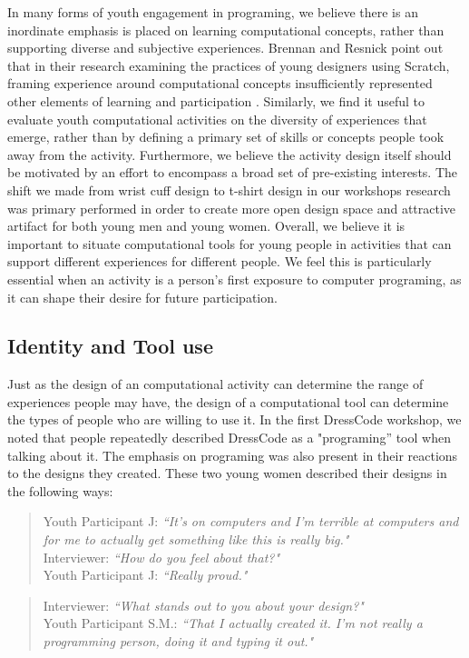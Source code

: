 \documentclass{sigchi}
\begin{document}
In many forms of youth engagement in programing, we believe there is an inordinate emphasis is placed on learning computational concepts, rather than supporting diverse and subjective experiences. Brennan and Resnick point out that in their research examining the practices of young designers using Scratch, framing experience around computational concepts insufficiently represented other elements of learning and participation \cite{computational_thinking}. Similarly, we find it useful to evaluate youth computational activities on the diversity of experiences that emerge, rather than by defining a primary set of skills or concepts people took away from the activity. Furthermore, we believe the activity design itself should be motivated by an effort to encompass a broad set of pre-existing interests. The shift we made from wrist cuff design to t-shirt design in our workshops research was primary performed in order to create more open design space and attractive artifact for both young men and young women. Overall, we believe it is important to situate computational tools for young people in activities that can support different experiences for different people. We feel this is particularly essential when an activity is a person's first exposure to computer programing, as it can shape their desire for future participation. 

\subsection{Identity and Tool use}
Just as the design of an computational activity can determine the range of experiences people may have, the design of a computational tool can determine the types of people who are willing to use it. In the first DressCode workshop, we noted that people repeatedly described DressCode as a "programing'' tool when talking about it. The emphasis on programing was also present in their reactions to the designs they created. These two young women described their designs in the following ways:
 \begin{quotation}
Youth Participant J: \textit{``It's on computers and I'm terrible at computers and for me to actually get something like this is really big."} 
\\Interviewer:  \textit{``How do you feel about that?"}
\\Youth Participant J:  \textit{``Really proud."} 
\end{quotation}

 \begin{quotation}
 Interviewer:  \textit{``What stands out to you about your design?"}
 \\Youth Participant S.M.: \textit{``That I actually created it. I'm not really a programming person, doing it and typing it out."}
 \end{quotation}
\end{document}
